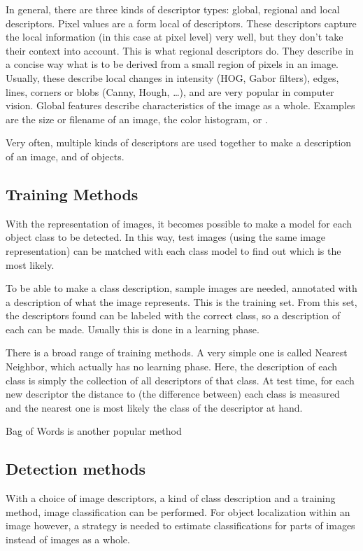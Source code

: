 \documentclass[a4paper,10pt]{article}
\begin{document}
In general, there are three kinds of descriptor types: global, regional and local descriptors. Pixel values are a form local of descriptors. These descriptors capture the local information (in this case at pixel level) very well, but they don't take their context into account. This is what regional descriptors do. They describe in a concise way what is to be derived from a small region of pixels in an image. Usually, these describe local changes in intensity (HOG, Gabor filters), edges, lines, corners or blobs (Canny, Hough, \ldots{}), and are very popular in computer vision. Global features describe characteristics of the image as a whole. Examples are the size or filename of an image, the color histogram, or .

Very often, multiple kinds of descriptors are used together to make a description of an image, and of objects.


\subsection{Training Methods} %
\label{sub:training_methods}
With the representation of images, it becomes possible to make a model for each object class to be detected. In this way, test images (using the same image representation) can be matched with each class model to find out which is the most likely.

To be able to make a class description, sample images are needed, annotated with a description of what the image represents. This is the training set. From this set, the descriptors found can be labeled with the correct class, so a description of each can be made. Usually this is done in a learning phase.

There is a broad range of training methods. A very simple one is called Nearest Neighbor, which actually has no learning phase. Here, the description of each class is simply the collection of all descriptors of that class. At test time, for each new descriptor the distance to (the difference between) each class is measured and the nearest one is most likely the class of the descriptor at hand. \cite{boiman2008defense}

Bag of Words is another popular method \cite{lazebnik2006beyond, van2011exploiting} 

\subsection{Detection methods} %
\label{sub:detection_methods}
With a choice of image descriptors, a kind of class description and a training method, image classification can be performed. For object localization within an image however, a strategy is needed to estimate classifications for parts of images instead of images as a whole.
\end{document}
